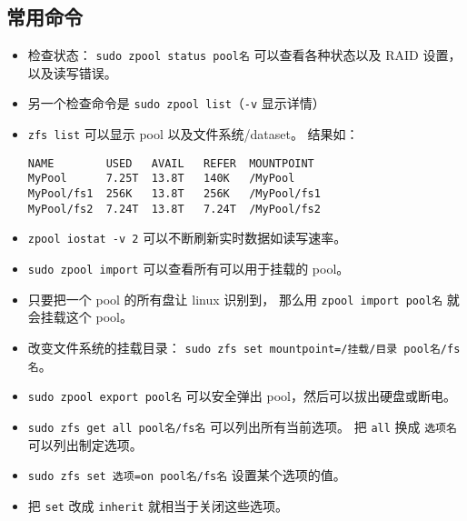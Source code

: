 \subsection{常用命令}
\begin{itemize}
\item 检查状态： \verb|sudo zpool status pool名| 可以查看各种状态以及 RAID 设置， 以及读写错误。
\item 另一个检查命令是 \verb|sudo zpool list|（\verb|-v| 显示详情）
\item \verb`zfs list` 可以显示 pool 以及文件系统/dataset。 结果如：
\begin{lstlisting}[language=none]
NAME        USED   AVAIL   REFER  MOUNTPOINT
MyPool      7.25T  13.8T   140K   /MyPool
MyPool/fs1  256K   13.8T   256K   /MyPool/fs1
MyPool/fs2  7.24T  13.8T   7.24T  /MyPool/fs2
\end{lstlisting}
\item \verb|zpool iostat -v 2| 可以不断刷新实时数据如读写速率。
\item \verb|sudo zpool import| 可以查看所有可以用于挂载的 pool。
\item 只要把一个 pool 的所有盘让 linux 识别到， 那么用 \verb|zpool import pool名| 就会挂载这个 pool。
\item 改变文件系统的挂载目录： \verb|sudo zfs set mountpoint=/挂载/目录 pool名/fs名|。
\item \verb|sudo zpool export pool名| 可以安全弹出 pool，然后可以拔出硬盘或断电。
\item \verb|sudo zfs get all pool名/fs名| 可以列出所有当前选项。 把 \verb|all| 换成 \verb|选项名| 可以列出制定选项。
\item \verb|sudo zfs set 选项=on pool名/fs名| 设置某个选项的值。
\item 把 \verb|set| 改成 \verb|inherit| 就相当于关闭这些选项。
\end{itemize}


